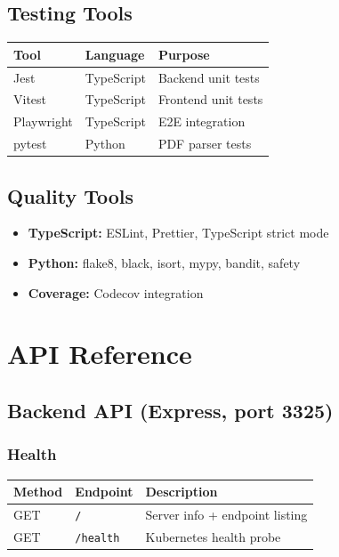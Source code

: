 \documentclass[11pt,a4paper]{article}
\newcommand{\code}[1]{\texttt{#1}}
\begin{document}
\subsection{Testing Tools}

\begin{center}
\begin{longtable}{@{}L{3cm}L{3cm}L{5cm}@{}}
\toprule
\textbf{Tool} & \textbf{Language} & \textbf{Purpose} \\
\midrule
\endhead
Jest       & TypeScript & Backend unit tests \\
Vitest     & TypeScript & Frontend unit tests \\
Playwright & TypeScript & E2E integration \\
pytest     & Python     & PDF parser tests \\
\bottomrule
\end{longtable}
\end{center}

\subsection{Quality Tools}
\begin{itemize}[noitemsep]
    \item \textbf{TypeScript:} ESLint, Prettier, TypeScript strict mode
    \item \textbf{Python:} flake8, black, isort, mypy, bandit, safety
    \item \textbf{Coverage:} Codecov integration
\end{itemize}

\section{API Reference}

\subsection*{Backend API (Express, port 3325)}

\subsubsection*{Health}
\begin{center}
\begin{longtable}{@{}L{2cm}L{3cm}L{6cm}@{}}
\toprule
\textbf{Method} & \textbf{Endpoint} & \textbf{Description} \\
\midrule
\endhead
GET & \code{/}       & Server info + endpoint listing \\
GET & \code{/health} & Kubernetes health probe \\
\bottomrule
\end{longtable}
\end{center}
\end{document}
